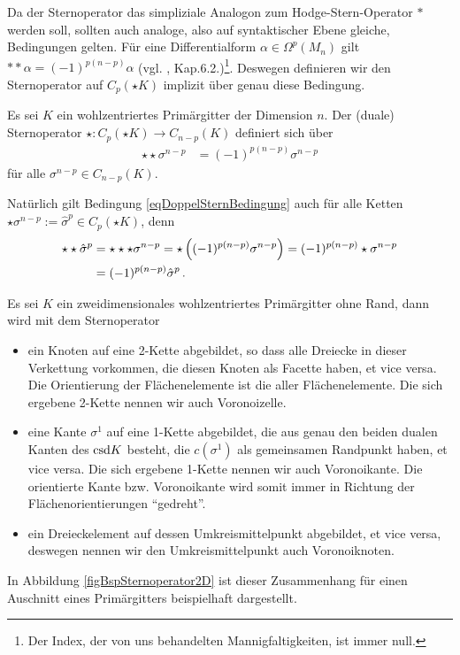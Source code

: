   Da der Sternoperator das simpliziale Analogon zum Hodge-Stern-Operator \( * \) werden soll, sollten auch analoge, also auf syntaktischer Ebene gleiche, Bedingungen gelten.
  Für eine Differentialform \( \alpha\in\Omega^{p}(M_{n}) \) gilt 
  \( **\alpha = (-1)^{p(n-p)}\alpha \) (vgl. \cite{Marsden}, Kap.6.2.)\footnote{Der Index, der von uns behandelten Mannigfaltigkeiten, ist immer null.}.
  Deswegen definieren wir den Sternoperator auf \( C_{p}(\star K) \) implizit über genau diese Bedingung.

  \begin{definition}
    \label{defDoppelSternBedingung}
    Es sei \( K \) ein wohlzentriertes Primärgitter der Dimension \( n \).
    Der (duale) Sternoperator \( \star: C_{p}(\star K) \rightarrow   C_{n-p}(K) \) definiert sich über
    \begin{align}
      \label{eqDoppelSternBedingung}
      \star\star \sigma^{n-p} &= (-1)^{p(n-p)}\sigma^{n-p}
    \end{align}
    für alle \( \sigma^{n-p} \in C_{n-p}(K) \).
  \end{definition}
  Natürlich gilt Bedingung \eqref{eqDoppelSternBedingung} auch für alle Ketten \( \star\sigma^{n-p} := \hat{\sigma}^{p} \in C_{p}(\star K)\), denn
  \begin{align}
    \begin{aligned}
    \star\star\hat{\sigma}^{p} &= \star\star\star\sigma^{n-p} = \star\left((-1)^{p(n-p)}\sigma^{n-p}\right)
                                = (-1)^{p(n-p)}\star\sigma^{n-p} \\
                                &=  (-1)^{p(n-p)}\hat{\sigma}^{p} \,\text{.}
    \end{aligned}
  \end{align}

  \begin{bemerkung}
    Es sei \( K \) ein zweidimensionales wohlzentriertes Primärgitter ohne Rand,
    dann wird mit dem Sternoperator
    \begin{itemize}
      \item ein Knoten auf eine 2-Kette abgebildet, so dass alle Dreiecke in dieser Verkettung vorkommen, die diesen Knoten als Facette haben, et vice versa.
            Die Orientierung der Flächenelemente ist die aller Flächenelemente. Die sich ergebene 2-Kette nennen wir auch Voronoizelle.
      \item eine Kante \( \sigma^{1} \) auf eine 1-Kette abgebildet, die aus genau den beiden dualen Kanten des \( \text{csd} K \) besteht, die \( c(\sigma^{1}) \) als gemeinsamen Randpunkt
            haben, et vice versa.
            Die sich ergebene 1-Kette nennen wir auch Voronoikante. 
            Die orientierte Kante bzw. Voronoikante wird somit immer in Richtung der Flächenorientierungen "`gedreht"'.
      \item ein Dreieckelement auf dessen Umkreismittelpunkt abgebildet, et vice versa, deswegen nennen wir den Umkreismittelpunkt auch Voronoiknoten.
    \end{itemize}
    In Abbildung \ref{figBspSternoperator2D} ist dieser Zusammenhang für einen Auschnitt eines Primärgitters beispielhaft dargestellt.
  \end{bemerkung}

